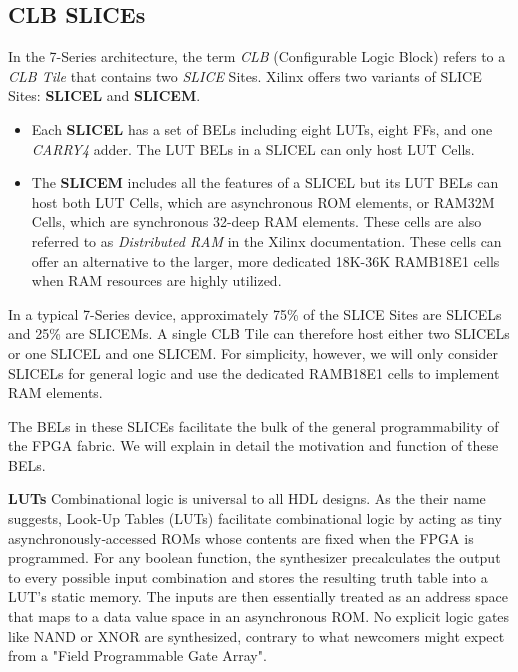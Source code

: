 \documentclass{article}
\begin{document}
    \vfill
    \begin{multicols}{2}

    \newpage
    \subsection{CLB SLICEs}

    In the 7-Series architecture, the term \emph{CLB} (Configurable Logic Block) refers to a \emph{CLB Tile} that contains two \emph{SLICE} Sites. 
    Xilinx offers two variants of SLICE Sites: \textbf{SLICEL} and \textbf{SLICEM}.
    \begin{itemize}
        \item Each \textbf{SLICEL} has a set of BELs including eight LUTs, eight FFs, and one   \emph{CARRY4} adder. The LUT BELs in a SLICEL can only host LUT Cells. 
        \item The \textbf{SLICEM} includes all the features of a SLICEL but its LUT BELs can host both LUT Cells, which are asynchronous ROM elements, or RAM32M Cells, which are synchronous 32-deep RAM elements. These cells are also referred to as \emph{Distributed RAM} in the Xilinx documentation.
        These cells can offer an alternative to the larger, more dedicated 18K-36K RAMB18E1 cells when RAM resources are highly utilized. 
    \end{itemize}
    In a typical 7-Series device, approximately 75\% of the SLICE Sites are SLICELs and 25\% are SLICEMs. 
    A single CLB Tile can therefore host either two SLICELs or one SLICEL and one SLICEM.
    For simplicity, however, we will only consider SLICELs for general logic and use the dedicated RAMB18E1 cells to implement RAM elements. 

    The BELs in these SLICEs facilitate the bulk of the general programmability of the FPGA fabric. 
    We will explain in detail the motivation and function of these BELs. 


    \textbf{LUTs} \quad
        Combinational logic is universal to all HDL designs. 
        As the their name suggests, Look‑Up Tables (LUTs) facilitate combinational logic by acting as tiny asynchronously‑accessed ROMs whose contents are fixed when the FPGA is programmed.  
        For any boolean function, the synthesizer precalculates the output to every possible input combination and stores the resulting truth table into a LUT's static memory. 
        The inputs are then essentially treated as an address space that maps to a data value space in an asynchronous ROM. 
        No explicit logic gates like NAND or XNOR are synthesized, contrary to what newcomers might expect from a "Field Programmable Gate Array". 


\end{multicols}
\end{document}

